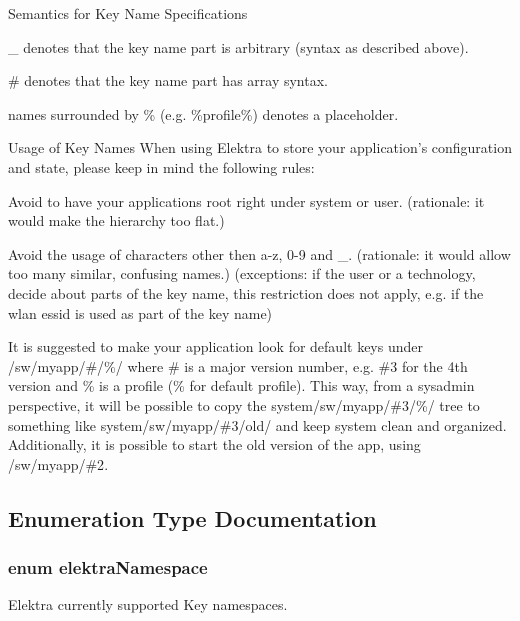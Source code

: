 \begin{DoxyParagraph}{Semantics for Key Name Specifications}

\begin{DoxyItemize}
\item \-\_\- denotes that the key name part is arbitrary (syntax as described above).
\item \# denotes that the key name part has array syntax.
\item names surrounded by \% (e.\-g. \%profile\%) denotes a placeholder.
\end{DoxyItemize}
\end{DoxyParagraph}
\begin{DoxyParagraph}{Usage of Key Names}
When using Elektra to store your application's configuration and state, please keep in mind the following rules\-:
\begin{DoxyItemize}
\item Avoid to have your applications root right under {\ttfamily system} or {\ttfamily user}. (rationale\-: it would make the hierarchy too flat.)
\item Avoid the usage of characters other then a-\/z, 0-\/9 and \-\_\-. (rationale\-: it would allow too many similar, confusing names.) (exceptions\-: if the user or a technology, decide about parts of the key name, this restriction does not apply, e.\-g. if the wlan essid is used as part of the key name)
\item It is suggested to make your application look for default keys under {\ttfamily /sw/myapp/\#/\%/} where \# is a major version number, e.\-g. \#3 for the 4th version and \% is a profile (\% for default profile). This way, from a sysadmin perspective, it will be possible to copy the {\ttfamily system/sw/myapp/\#3/\%/} tree to something like {\ttfamily system/sw/myapp/\#3/old/} and keep system clean and organized. Additionally, it is possible to start the old version of the app, using {\ttfamily /sw/myapp/\#2}. 
\end{DoxyItemize}
\end{DoxyParagraph}


\subsection{Enumeration Type Documentation}
\hypertarget{group__keyname_gaec3b8d6f430ae49b91bafe8a86310a68}{
\subsubsection[{elektra\-Namespace}]{\setlength{\rightskip}{0pt plus 5cm}enum {\bf elektra\-Namespace}}}\label{group__keyname_gaec3b8d6f430ae49b91bafe8a86310a68}
Elektra currently supported Key namespaces.

